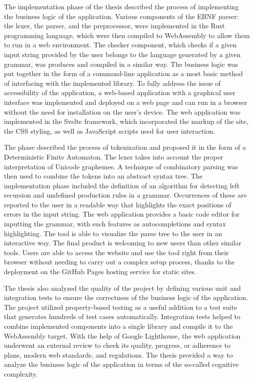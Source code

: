 \documentclass[english,bachelors,forcepolishlogotype]{wizthesis}
\begin{document}
The implementation phase of the thesis described the process of implementing the
business logic of the application. Various components of the EBNF parser: the
lexer, the parser, and the preprocessor, were implemented in the Rust
programming language, which were then compiled to WebAssembly to allow them to
run in a web environment. The checker component, which checks if a given input
string provided by the user belongs to the language generated by a given
grammar, was produces and compiled in a similar way. The business logic was put
together in the form of a command-line application as a most basic method of
interfacing with the implemented library. To fully address the issue of
accessibility of the application, a web-based application with a graphical user
interface was implemented and deployed on a web page and can run in a browser
without the need for installation on the user's device. The web application was
implemented in the Svelte framework, which incorporated the markup of the site,
the CSS styling, as well as JavaScript scripts used for user interaction.

The phase described the process of tokenization and proposed it in the form of a
Deterministic Finite Automaton. The lexer takes into account the proper
interpretation of Unicode graphemes. A technique of combinatory parsing was then
used to combine the tokens into an abstract syntax tree. The implementation
phase included the definition of an algorithm for detecting left recursion and
undefined production rules in a grammar. Occurrences of these are reported to
the user in a readable way that highlights the exact positions of errors in the
input string. The web application provides a basic code editor for inputting the
grammar, with such features as autocompletions and syntax highlighting. The tool
is able to visualize the parse tree to the user in an interactive way. The final
product is welcoming to new users than other similar tools. Users are able to
access the website and use the tool right from their browser without needing to
carry out a complex setup process, thanks to the deployment on the GitHub Pages
hosting service for static sites.

The thesis also analyzed the quality of the project by defining various unit and
integration tests to ensure the correctness of the business logic of the
application. The project utilized property-based testing as a useful addition to
a test suite that generates hundreds of test cases automatically. Integration
tests helped to combine implemented components into a single library and compile
it to the WebAssembly target. With the help of Google Lighthouse, the web
application underwent an external review to check its quality, progress, or
adherence to plans, modern web standards, and regulations. The thesis provided a
way to analyze the business logic of the application in terms of the so-called
cognitive complexity.
\end{document}
